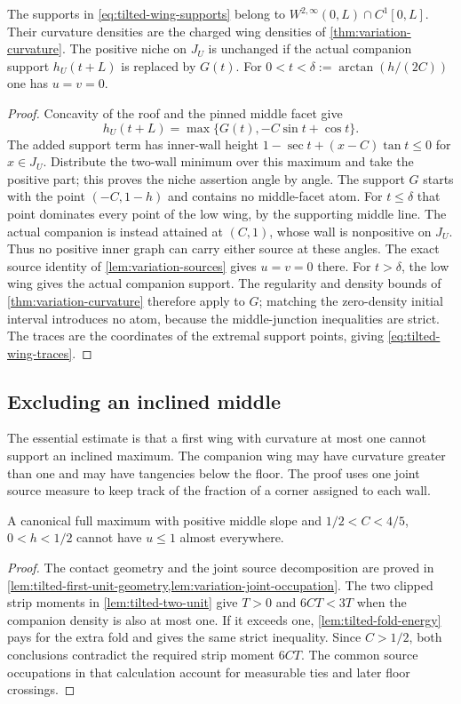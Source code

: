 \begin{lemma}\label{lem:tilted-surrogate}
The supports in \cref{eq:tilted-wing-supports} belong to
$W^{2,\infty}(0,L)\cap C^1[0,L]$. Their curvature densities are
the charged wing densities of \cref{thm:variation-curvature}.
The positive niche on $J_U$ is unchanged if the actual companion
support $h_U(t+L)$ is replaced by $G(t)$.
For $0<t<\delta:=\arctan(h/(2C))$ one has $u=v=0$.
\end{lemma}
\begin{proof}
Concavity of the roof and the pinned middle facet give
\[
 h_U(t+L)=\max\{G(t),-C\sin t+\cos t\}.
\]
The added support term has inner-wall height
$1-\sec t+(x-C)\tan t\le0$ for $x\in J_U$.
Distribute the two-wall minimum over this maximum and take the
positive part; this proves the niche assertion angle by angle.
The support $G$ starts with the point $(-C,1-h)$ and contains no
middle-facet atom. For $t\le\delta$ that point dominates every
point of the low wing, by the supporting middle line. The actual
companion is instead attained at $(C,1)$, whose wall is
nonpositive on $J_U$. Thus no positive inner graph can carry
either source at these angles. The exact source identity of
\cref{lem:variation-sources} gives $u=v=0$ there. For
$t>\delta$, the low wing gives the actual companion support.
The regularity and density bounds of
\cref{thm:variation-curvature} therefore apply to $G$; matching
the zero-density initial interval introduces no atom, because
the middle-junction inequalities are strict. The traces are the
coordinates of the extremal support points, giving
\cref{eq:tilted-wing-traces}.
\end{proof}

\subsection{Excluding an inclined middle}

The essential estimate is that a first wing with curvature at
most one cannot support an inclined maximum. The companion wing
may have curvature greater than one and may have tangencies
below the floor. The proof uses one joint source measure to keep
track of the fraction of a corner assigned to each wall.

\begin{proposition}
\label{lem:tilted-first-unit-exclusion}
A canonical full maximum with positive middle slope and
$1/2<C<4/5$, $0<h<1/2$ cannot have $u\le1$ almost everywhere.
\end{proposition}
\begin{proof}
The contact geometry and the joint source decomposition are proved
in \cref{lem:tilted-first-unit-geometry,lem:variation-joint-occupation}.
The two clipped strip moments in \cref{lem:tilted-two-unit} give
$T>0$ and $6CT<3T$ when the companion density is also at most one.
If it exceeds one, \cref{lem:tilted-fold-energy} pays for the extra
fold and gives the same strict inequality. Since $C>1/2$, both
conclusions contradict the required strip moment $6CT$. The common
source occupations in that calculation account for measurable ties
and later floor crossings.
\end{proof}

